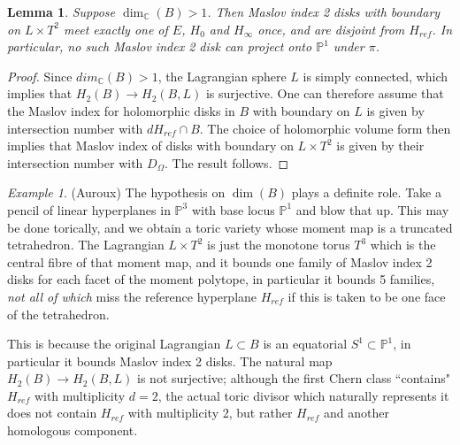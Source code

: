 \documentclass[reqno,10pt]{amsart}
\numberwithin{equation}{section}
\newcommand{\bC}{{\mathbb C}}
\newcommand{\bP}{{\mathbb P}}
\newtheorem{Lemma}[thm]{Lemma}
\theoremstyle{remark}
\newtheorem{Example}[thm]{Example}
\begin{document}
\begin{Lemma} \label{Lem:MaslovViaIntersection}
Suppose $\dim_{\bC}(B) > 1$.  Then Maslov index 2 disks with boundary on $L \times T^2$ meet exactly one of $E$, $H_0$ and $H_{\infty}$ once, and are disjoint from $H_{ref}$.  In particular, no such Maslov index 2 disk can project onto $\bP^1$ under $\pi$.
\end{Lemma}

\begin{proof}
Since $dim_{\bC}(B)>1$, the Lagrangian sphere $L$ is simply connected, which implies that $H_2(B) \rightarrow H_2(B,L)$ is surjective.  One can therefore assume that the Maslov index for holomorphic disks in $B$ with boundary on $L$ is given by intersection number with $dH_{ref} \cap B$.  The choice of holomorphic volume form then implies that Maslov index of disks with boundary on $L\times T^2$ is given by their intersection number with $D_{\Omega}$.  The result follows.
\end{proof}

\begin{Example} (Auroux)
The hypothesis on $\dim(B)$ plays a definite role. Take a pencil of linear hyperplanes in $\bP^3$ with base locus $\bP^1$ and blow that up.  This may be done torically, and we obtain a toric variety whose moment map is a truncated tetrahedron.  The Lagrangian $L\times T^2$ is just the monotone torus $T^3$ which is the central fibre of that moment map, and it bounds one family of Maslov index 2 disks for each facet of the moment polytope, in particular it bounds 5 families, \emph{not all of which} miss the reference hyperplane $H_{ref}$ if this is taken to be one face of the tetrahedron. 

This is because the original Lagrangian $L\subset B$ is an equatorial $S^1 \subset \bP^1$, in particular it bounds Maslov index 2 disks. The natural map $H_2(B) \rightarrow H_2(B,L)$ is not surjective; although the first Chern class ``contains" $H_{ref}$ with multiplicity $d=2$, the actual toric divisor which naturally represents it does not contain $H_{ref}$ with multiplicity 2, but rather $H_{ref}$ and another homologous component.
\end{Example}
\end{document}
